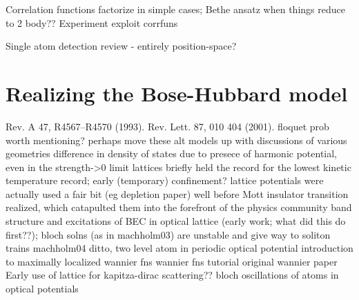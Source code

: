 		Correlation functions factorize in simple cases; Bethe ansatz when things reduce to 2 body??
		Experiment exploit corrfuns 
			\cite{Schweigler17}
			\cite{Hodgman17}

			Single atom detection
	\cite{Ott16} review - entirely position-space?


\section{Realizing the Bose-Hubbard model}
	\cite{Grimm00}%
	\cite{Miller93}%
	Rev.
	A 47, R4567–R4570 (1993).
	\cite{Barrett01}%
	Rev.
	Lett.
	87, 010 404 (2001).
	\cite{Cabrera}%
	\cite{Celi14}%
	\cite{Gadway18}%
	\cite{Ghose03}%
	floquet prob worth mentioning?
		perhaps move these alt models up with discussions of various geometries 
	\cite{Hooley04}
		difference in density of states due to presece of harmonic potential, even in the strength->0 limit
	\cite{Kastberg95}
		lattices briefly held the record for the lowest kinetic temperature record; early (temporary) confinement?
		lattice potentials were actually used a fair bit (eg depletion paper) well before Mott insulator transition realized, which catapulted them into the forefront of the physics community
	\cite{Machholm03}
		band structure and excitations of BEC in optical lattice (early work; what did this do first??);
		bloch solns (as in machholm03) are unstable and give way to soliton trains machholm04
	ditto, two level atom in periodic optical potential
		\cite{Wilkens91}
	introduction to maximally localized wannier fns
		\cite{Marzari00}
	\cite{Pavarini11}
		wannier fns tutorial
	original wannier paper
		\cite{Wannier37}
	\cite{Peik97}
		Early use of lattice for kapitza-dirac scattering?? bloch oscillations of atoms in optical potentials



